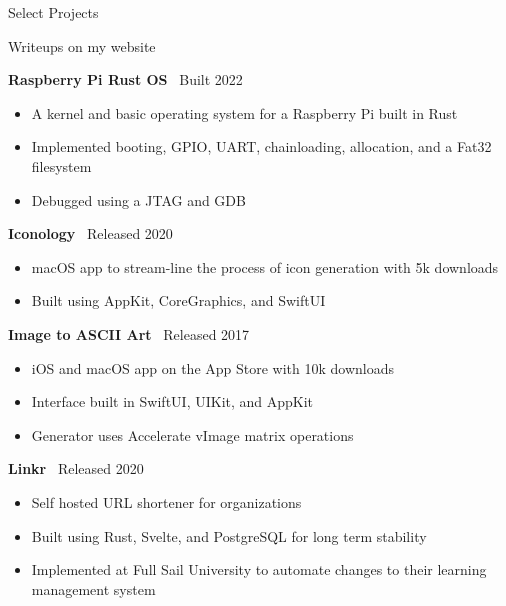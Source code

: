 \documentclass{resume}
\newif\ifisDigital
\begin{document}
\begin{rSection}{Select Projects}

\ifisDigital
\vspace{-1.25em}
\else
Writeups on my website
\fi

\item \textbf{Raspberry Pi Rust OS} \ {Built 2022} 
\ifisDigital\hfill\href{https://github.com/liamrosenfeld/rustos}{Source}\fi
\begin{itemize}
    \itemsep -3pt {}
    \vspace{-0.35em}
    \item A kernel and basic operating system for a Raspberry Pi built in Rust
    \item Implemented booting, GPIO, UART, chainloading, allocation, and a Fat32 filesystem
    \item Debugged using a JTAG and GDB
\end{itemize}

\item \textbf{Iconology} \ {Released 2020} 
\ifisDigital\hfill\href{https://liamrosenfeld.com/projects/iconology}{Writeup}\fi
\begin{itemize}
    \itemsep -3pt {}
    \vspace{-0.35em}
    \item macOS app to stream-line the process of icon generation with 5k downloads
    \item Built using AppKit, CoreGraphics, and SwiftUI
\end{itemize}

\item \textbf{Image to ASCII Art} \ {Released 2017}
\ifisDigital\hfill \href{https://liamrosenfeld.com/projects/ascii-art/}{Writeup}\fi
\begin{itemize}
    \itemsep -3pt {} 
    \vspace{-0.35em}
    \item iOS and macOS app on the App Store with 10k downloads
    \item Interface built in SwiftUI, UIKit, and AppKit
    \item Generator uses Accelerate vImage matrix operations
\end{itemize}

\item \textbf{Linkr} \ {Released 2020}
\ifisDigital\hfill \href{https://liamrosenfeld.com/projects/linkr/}{Writeup}\fi
\begin{itemize}
    \itemsep -3pt {} 
    \vspace{-0.35em}
    \item Self hosted URL shortener for organizations
    \item Built using Rust, Svelte, and PostgreSQL for long term stability
    \item Implemented at Full Sail University to automate changes to their learning management system
\end{itemize}


\end{rSection}
\end{document}
